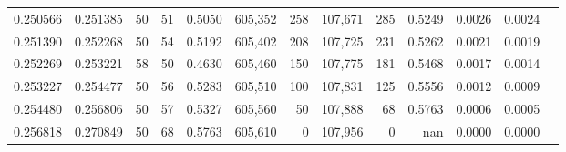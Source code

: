 \begin{tabular}{rrrrrrrrrrrrr}
0.250566 & 0.251385 &    50 &  51 &                                     0.5050 & 605,352 &     258 & 107,671 &     285 & 0.5249 & 0.0026 & 0.0024 \\
0.251390 & 0.252268 &    50 &  54 &                                     0.5192 & 605,402 &     208 & 107,725 &     231 & 0.5262 & 0.0021 & 0.0019 \\
0.252269 & 0.253221 &    58 &  50 &                                     0.4630 & 605,460 &     150 & 107,775 &     181 & 0.5468 & 0.0017 & 0.0014 \\
0.253227 & 0.254477 &    50 &  56 &                                     0.5283 & 605,510 &     100 & 107,831 &     125 & 0.5556 & 0.0012 & 0.0009 \\
0.254480 & 0.256806 &    50 &  57 &                                     0.5327 & 605,560 &      50 & 107,888 &      68 & 0.5763 & 0.0006 & 0.0005 \\
0.256818 & 0.270849 &    50 &  68 &                                     0.5763 & 605,610 &       0 & 107,956 &       0 &    nan & 0.0000 & 0.0000 \\
\bottomrule
\end{tabular}
